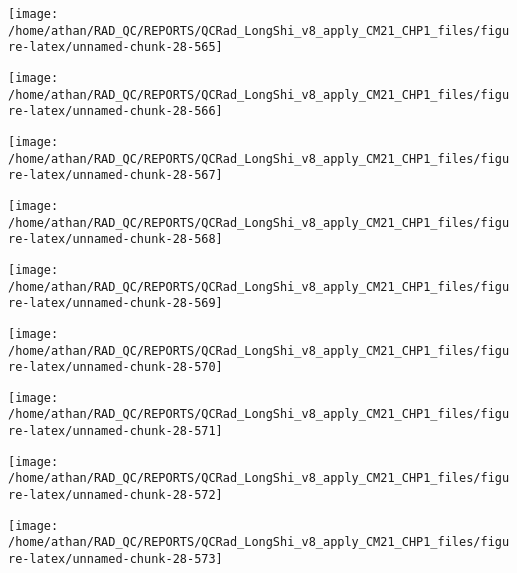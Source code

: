 \documentclass[
  10pt,
  a4paper,oneside]{article}
\begin{document}
\begin{center}\texttt{[image: /home/athan/RAD\_QC/REPORTS/QCRad\_LongShi\_v8\_apply\_CM21\_CHP1\_files/figure-latex/unnamed-chunk-28-565]} \end{center}

\begin{center}\texttt{[image: /home/athan/RAD\_QC/REPORTS/QCRad\_LongShi\_v8\_apply\_CM21\_CHP1\_files/figure-latex/unnamed-chunk-28-566]} \end{center}

\begin{center}\texttt{[image: /home/athan/RAD\_QC/REPORTS/QCRad\_LongShi\_v8\_apply\_CM21\_CHP1\_files/figure-latex/unnamed-chunk-28-567]} \end{center}

\begin{center}\texttt{[image: /home/athan/RAD\_QC/REPORTS/QCRad\_LongShi\_v8\_apply\_CM21\_CHP1\_files/figure-latex/unnamed-chunk-28-568]} \end{center}

\begin{center}\texttt{[image: /home/athan/RAD\_QC/REPORTS/QCRad\_LongShi\_v8\_apply\_CM21\_CHP1\_files/figure-latex/unnamed-chunk-28-569]} \end{center}

\begin{center}\texttt{[image: /home/athan/RAD\_QC/REPORTS/QCRad\_LongShi\_v8\_apply\_CM21\_CHP1\_files/figure-latex/unnamed-chunk-28-570]} \end{center}

\begin{center}\texttt{[image: /home/athan/RAD\_QC/REPORTS/QCRad\_LongShi\_v8\_apply\_CM21\_CHP1\_files/figure-latex/unnamed-chunk-28-571]} \end{center}

\begin{center}\texttt{[image: /home/athan/RAD\_QC/REPORTS/QCRad\_LongShi\_v8\_apply\_CM21\_CHP1\_files/figure-latex/unnamed-chunk-28-572]} \end{center}

\begin{center}\texttt{[image: /home/athan/RAD\_QC/REPORTS/QCRad\_LongShi\_v8\_apply\_CM21\_CHP1\_files/figure-latex/unnamed-chunk-28-573]} \end{center}
\end{document}
